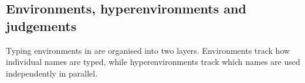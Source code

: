 

\subsection{Environments, hyperenvironments and judgements}\label{subsec:env-hyper-judge}
Typing environments in \pill{} are organised into two layers. Environments track how individual names are typed, while hyperenvironments track which names are used independently in parallel.

